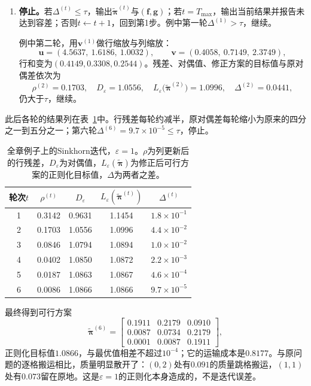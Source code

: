 \begin{enumerate}
 \item \textbf{停止。}若$\Delta^{(t)}\leq\tau$，输出$\tilde{\bm{\pi}}^{(t)}$与$(\bm{f},\bm{g})$；若$t=T_{\max}$，输出当前结果并报告未达到容差；否则$t\leftarrow t+1$，回到第1步。例中第一轮$\Delta^{(1)}>\tau$，继续。

 例中第二轮，用$\bm{v}^{(1)}$做行缩放与列缩放：
 \[
  \bm{u}=(4.5637,\ 1.6186,\ 1.0032),\qquad \bm{v}=(0.4058,\ 0.7149,\ 2.3749),
 \]
 行和变为$(0.4149,0.3308,0.2544)$。残差、对偶值、修正方案的目标值与原对偶差依次为
 \[
  \rho^{(2)}=0.1703,\quad D_\varepsilon=1.0556,\quad L_\varepsilon\bigl(\tilde{\bm{\pi}}^{(2)}\bigr)=1.0996,\quad \Delta^{(2)}=0.0441,
 \]
 仍大于$\tau$，继续。
\end{enumerate}

此后各轮的结果列在表~\ref{tab:ot-sinkhorn-rounds}中。行残差每轮约减半，原对偶差每轮缩小为原来的四分之一到五分之一；第六轮$\Delta^{(6)}=9.7\times10^{-5}\leq\tau$，停止。

\begin{table}[htbp]
 \centering
 \caption{全章例子上的Sinkhorn迭代，$\varepsilon=1$。$\rho$为列更新后的行残差，$D_\varepsilon$为对偶值，$L_\varepsilon(\tilde{\bm{\pi}})$为修正后可行方案的正则化目标值，$\Delta$为两者之差。}
 \label{tab:ot-sinkhorn-rounds}
 \begin{tabular}{ccccc}
  \toprule
  轮次$t$ & $\rho^{(t)}$ & $D_\varepsilon$ & $L_\varepsilon(\tilde{\bm{\pi}}^{(t)})$ & $\Delta^{(t)}$\\
  \midrule
  1 & 0.3142 & 0.9631 & 1.1454 & $1.8\times10^{-1}$\\
  2 & 0.1703 & 1.0556 & 1.0996 & $4.4\times10^{-2}$\\
  3 & 0.0846 & 1.0794 & 1.0894 & $1.0\times10^{-2}$\\
  4 & 0.0402 & 1.0850 & 1.0872 & $2.2\times10^{-3}$\\
  5 & 0.0187 & 1.0863 & 1.0867 & $4.6\times10^{-4}$\\
  6 & 0.0086 & 1.0866 & 1.0866 & $9.7\times10^{-5}$\\
  \bottomrule
 \end{tabular}
\end{table}

最终得到可行方案
\[
 \tilde{\bm{\pi}}^{(6)}=\begin{bmatrix}0.1911&0.2179&0.0910\\0.0087&0.0734&0.2179\\0.0001&0.0087&0.1911\end{bmatrix},
\]
正则化目标值$1.0866$，与最优值相差不超过$10^{-4}$；它的运输成本是$0.8177$。与原问题的逐格搬运相比，质量明显散开了：$(0,2)$处有$0.091$的质量跳格搬运，$(1,1)$处有$0.073$留在原地。这是$\varepsilon=1$的正则化本身造成的，不是迭代误差。


